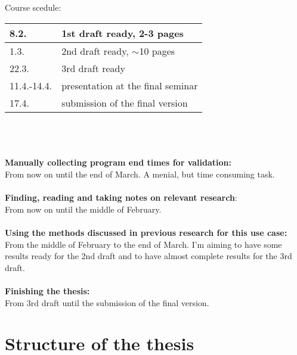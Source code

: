 \documentclass[12pt,a4paper,english,oneside]{article}
\begin{document}
Course scedule:

\begin{tabular}{|p{20mm}|p{130mm}|}
\hline
8.2.   & 1st draft ready, 2-3 pages \\ \hline
1.3.   & 2nd draft ready, $\sim$10 pages \\ \hline
22.3.  & 3rd draft ready \\ \hline
11.4.-14.4. & presentation at the final seminar \\ \hline
17.4.  & submission of the final version \\ \hline
\end{tabular}
\\
\\
\\
\textbf{Manually collecting program end times for validation:}\\
From now on until the end of March. A menial, but time consuming task.
\\
\\
\textbf{Finding, reading and taking notes on relevant research}:\\
From now on until the middle of February.  
\\
\\
\textbf{Using the methods discussed in previous research for this use case:}\\
From the middle of February to the end of March. I'm aiming to have some results ready for the 2nd draft and to have almost complete results for the 3rd draft.
\\
\\
\textbf{Finishing the thesis:}\\
From 3rd draft until the submission of the final version.


\section{Structure of the thesis}
\end{document}
